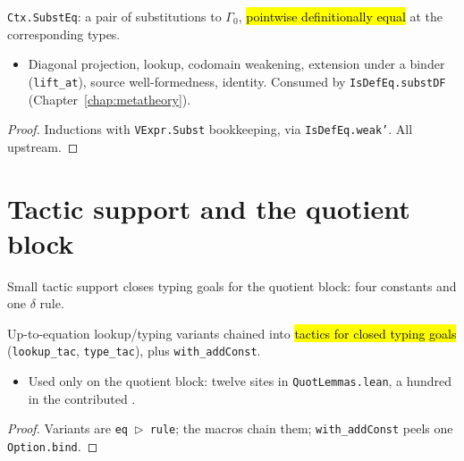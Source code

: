 \begin{lemma}
\label{fam:substeq}
\leanok
{}

 \texttt{Ctx.SubstEq}: a pair of substitutions to $\Gamma_0$, \hl{pointwise
definitionally equal} at the corresponding types.
\begin{itemize}
\item Diagonal projection, lookup, codomain weakening, extension under a binder
  (\texttt{lift\_at}), source well-formedness, identity. Consumed by
  \texttt{IsDefEq.substDF} (Chapter~\ref{chap:metatheory}).
\end{itemize}
\end{lemma}
\begin{proof}
\leanok
{} Inductions with \texttt{VExpr.Subst} bookkeeping, via \texttt{IsDefEq.weak'}.
All upstream.
\end{proof}

\section{Tactic support and the quotient block}

Small tactic support closes typing goals for the quotient block: four constants and one
$\delta$ rule.

\begin{lemma}
\label{fam:typing-meta}
\leanok
{}

 Up-to-equation lookup/typing variants chained into \hl{tactics for closed
typing goals} (\texttt{lookup\_tac}, \texttt{type\_tac}), plus \texttt{with\_addConst}.
\begin{itemize}
\item Used only on the quotient block: twelve sites in \texttt{QuotLemmas.lean}, a hundred
  in the contributed .
\end{itemize}
\end{lemma}
\begin{proof}
\leanok
{} Variants are \texttt{eq $\triangleright$ rule}; the macros chain them;
\texttt{with\_addConst} peels one \texttt{Option.bind}.
\end{proof}

